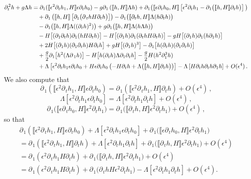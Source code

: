 \documentclass[11pt]{article}
\theoremstyle{plain}
\theoremstyle{definition}
\theoremstyle{definition}
\def\p{\text{\bf\emph{p}}}
\def\p{{\partial\hspace{1pt}}}
\def\comm#1#2{{\llbracket#1,#2\rrbracket}}
\def\smallexp#1{{\text{\small #1}}}
\def\dfrac#1#2{\smallexp{$\displaystyle{}\frac{#1}{#2}$}}
\begin{document}
\begin{align*}
\p_{\!t}^2 h + g\Lambda h &=\p_{\!1} (\comm{\epsilon^2\p_{\!t} h_1}{H} \epsilon\partial_t h_0) -g\p_{\!1} \left(\comm{h}{H} \Lambda h\right) + \p_{\!1} \big(\comm{\epsilon\p_{\!t} h_0}{H} \left[\epsilon^2\partial_t h_1-\p_{\!1} \big(\comm{h}{H} \partial_t h\big)\right]\big) \\
&\quad +\p_{\!1} \left(\comm{h}{H} \left[\partial_1 \big(\p_t hH\partial_t h \big)\right]\right) - \p_{\!1} \big(\comm{\p_{\!t} h}{H} \Lambda (h \partial_t h)\big) \\
&\quad - \p_{\!1} \big(\comm{h}{H} \Lambda ((\p_{\!t} h)^2)\big) + g\p_{\!1} \big(\comm{h}{H} \Lambda (h \Lambda h)\big) \\
&\quad - H \big[(\p_{\!1} \p_{\!t} h) \p_{\!1}(h H\p_{\!t} h)\big] - H \big[(\p_{\!1} h) \p_{\!1}(\p_{\!t} h H\p_{\!t} h)\big]
 - gH \big[(\p_{\!1} h) \p_{\!1}(h \partial_1 h)\big] \nonumber\\
&\quad + 2 H \big[(\p_{\!1}h) (\p_{\!1} \p_{\!t} h) H\p_{\!t} h\big] + gH \big[(\p_{\!1}h)^3\big] - \p_{\!1} \big[h (\p_{\!t} h) (\partial_1 \p_{\!t} h) \big] \\
&\quad + \dfrac{g}{2} \p_{\!1} \big[h^2 (\Lambda \p_{1} h)\big] - H \big[h (\p_{\!t} h)\Lambda \partial_1\p_{\!t} h\big] - \dfrac{g}{2} H (h^2 \partial_1^3h)\\
&\quad +\Lambda \left[\epsilon^2\partial_t h_{1}\epsilon \partial_t h_{0}  +H\epsilon\p_{\!t} h_0\left(-H\p_{\!t} h + \Lambda \big(\comm{h}{H}  \p_{\!t} h\big)\right)\right]- \Lambda \left[ H\p_{\!t} h \partial_t h \p_{\!1} h \right]+O(\epsilon^4)\,.
\end{align*}
We also compute that
$$
\p_{\!1} (\comm{\epsilon^2\p_{\!t} h_1}{H} \epsilon\partial_t h_0)=\p_{\!1} (\comm{\epsilon^2\p_{\!t}h_1}{H} \partial_t h)  +O(\epsilon^4)\,,
$$
$$
\Lambda \left[\epsilon^2\partial_t h_{1}\epsilon \partial_t h_{0}\right]=\Lambda \left[\epsilon^2\partial_t h_1\partial_t h\right]+O(\epsilon^4)\,,
$$
$$
\p_{\!1} \big(\comm{\epsilon\p_{\!t} h_0}{H} \epsilon^2\partial_t h_1\big)=\p_{\!1} \big(\comm{\p_{\!t} h}{H} \epsilon^2\partial_t h_1\big)+O(\epsilon^4)\,,
$$
so that
\begin{multline}
\p_{\!1} (\comm{\epsilon^2\p_{\!t} h_1}{H} \epsilon\partial_t h_0)+\Lambda \left[\epsilon^2\partial_t h_{1}\epsilon \partial_t h_{0}\right]+\p_{\!1} \big(\comm{\epsilon\p_{\!t} h_0}{H} \epsilon^2\partial_t h_1\big)\\
=\p_{\!1} (\comm{\epsilon^2\p_{\!t}h_1}{H} \partial_t h)+\Lambda \left[\epsilon^2\partial_t h_1\partial_t h\right]+\p_{\!1} \big(\comm{\p_{\!t} h}{H} \epsilon^2\partial_t h_1\big)+O(\epsilon^4)\\
=\p_{\!1} (\epsilon^2\p_{\!t}h_1H\partial_t h)+\p_{\!1} \big(\comm{\p_{\!t} h}{H} \epsilon^2\partial_t h_1\big)+O(\epsilon^4)\\
=\p_{\!1} (\epsilon^2\p_{\!t}h_1H\partial_t h)+\p_{\!1} \big(\p_{\!t} hH\epsilon^2\partial_t h_1\big)-\Lambda \left[\epsilon^2\partial_t h_1\partial_t h\right]+O(\epsilon^4).\label{eqauxb}
\end{multline}
\end{document}

